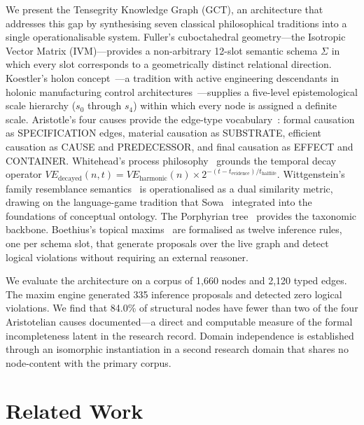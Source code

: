 \documentclass{iosart2x}
\begin{document}
We present the Tensegrity Knowledge Graph (GCT), an architecture that addresses this gap by synthesising seven classical philosophical traditions into a single operationalisable system. Fuller's cuboctahedral geometry---the Isotropic Vector Matrix (IVM)---provides a non-arbitrary 12-slot semantic schema $\Sigma$ in which every slot corresponds to a geometrically distinct relational direction. Koestler's holon concept~\cite{koestler1967ghost}---a tradition with active engineering descendants in holonic manufacturing control architectures~\cite{derigent2020industry}---supplies a five-level epistemological scale hierarchy ($s_0$ through $s_4$) within which every node is assigned a definite scale. Aristotle's four causes provide the edge-type vocabulary~\cite{aristotle_metaphysics}: formal causation as SPECIFICATION edges, material causation as SUBSTRATE, efficient causation as CAUSE and PREDECESSOR, and final causation as EFFECT and CONTAINER. Whitehead's process philosophy~\cite{whitehead1929process} grounds the temporal decay operator $\mathit{VE}_{\text{decayed}}(n, t) = \mathit{VE}_{\text{harmonic}}(n) \times 2^{-(t - t_{\text{evidence}}) / t_{\text{halflife}}}$. Wittgenstein's family resemblance semantics~\cite{wittgenstein1953philosophical} is operationalised as a dual similarity metric, drawing on the language-game tradition that Sowa~\cite{sowa2006signs} integrated into the foundations of conceptual ontology. The Porphyrian tree~\cite{porphyry_isagoge} provides the taxonomic backbone. Boethius's topical maxims~\cite{boethius_topicis} are formalised as twelve inference rules, one per schema slot, that generate proposals over the live graph and detect logical violations without requiring an external reasoner.

We evaluate the architecture on a corpus of 1,660 nodes and 2,120 typed edges. The maxim engine generated 335 inference proposals and detected zero logical violations. We find that 84.0\% of structural nodes have fewer than two of the four Aristotelian causes documented---a direct and computable measure of the formal incompleteness latent in the research record. Domain independence is established through an isomorphic instantiation in a second research domain that shares no node-content with the primary corpus.

\section{Related Work}
\label{sec:related}
\end{document}
